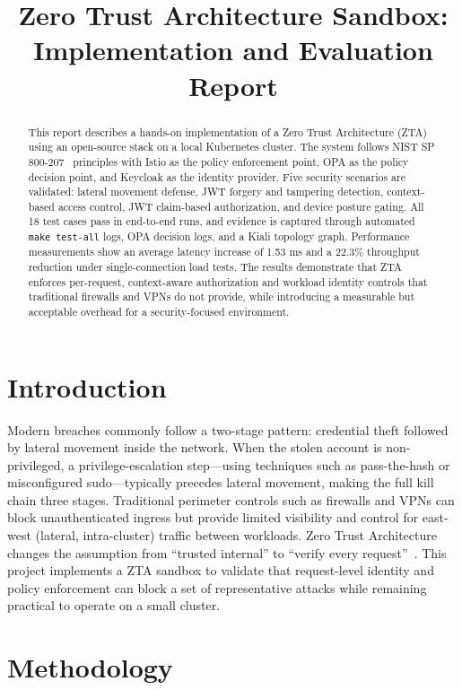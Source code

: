 \documentclass[conference]{IEEEtran}
\title{Zero Trust Architecture Sandbox: Implementation and Evaluation Report}
\author{\IEEEauthorblockN{Minsoo Ahn}
\IEEEauthorblockA{CSE 487 T92\\
Student ID: 114743792\\
Instructor: Antonino Mione\\
May 23, 2026}}
\begin{document}
\maketitle

\begin{abstract}
This report describes a hands-on implementation of a Zero Trust Architecture (ZTA)
using an open-source stack on a local Kubernetes cluster. The system follows NIST SP
800-207~\cite{nist} principles with Istio as the policy enforcement point, OPA as the policy
decision point, and Keycloak as the identity provider. Five security scenarios are
validated: lateral movement defense, JWT forgery and tampering detection, context-based access
control, JWT claim-based authorization, and device posture gating. All 18 test cases pass in
end-to-end runs, and evidence is captured through automated \texttt{make test-all} logs, OPA decision
logs, and a Kiali topology graph. Performance measurements show an average latency increase of 1.53 ms and a 22.3\%
throughput reduction under single-connection load tests. The results demonstrate that
ZTA enforces per-request, context-aware authorization and workload identity controls
that traditional firewalls and VPNs do not provide, while introducing a measurable but
acceptable overhead for a security-focused environment.
\end{abstract}

\section{Introduction}
Modern breaches commonly follow a two-stage pattern: credential theft followed by
lateral movement inside the network. When the stolen account is non-privileged, a
privilege-escalation step---using techniques such as pass-the-hash or misconfigured
sudo---typically precedes lateral movement, making the full kill chain three stages.
Traditional perimeter controls such as firewalls
and VPNs can block unauthenticated ingress but provide limited visibility and control
for east-west (lateral, intra-cluster) traffic between workloads. Zero Trust Architecture changes the assumption
from ``trusted internal'' to ``verify every request''~\cite{nist,beyondcorp}. This project implements a ZTA
sandbox to validate that request-level identity and policy enforcement can block a set
of representative attacks while remaining practical to operate on a small cluster.

\vspace{4pt}
\section{Methodology}
\end{document}

